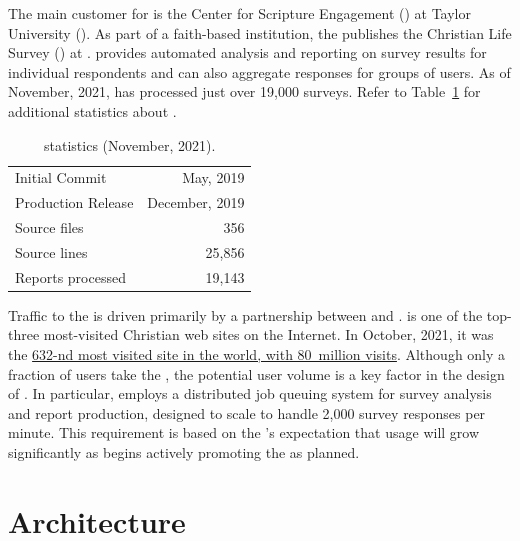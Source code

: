 \documentclass{article}
\begin{document}
The main customer for \caper{}
is the
Center for Scripture Engagement
(\cfse)
at Taylor University (\tu).
As part of a faith-based institution,
the \cfse{} publishes the
Christian Life Survey
(\cls)
at \qual.
\caper{} provides automated analysis and reporting on survey results
for individual respondents and
can also aggregate responses for groups of users.
As of November, 2021,
\caper{} has processed just over 19,000 surveys.
Refer to Table~\ref{tab:caper-stats} for additional statistics about \caper.

\begin{table}
  \centering
  \begin{tabular}{lr}
    \toprule
    Initial Commit     & May, 2019      \\
    Production Release & December, 2019 \\
    \midrule
    Source files       & 356            \\
    Source lines       & 25,856         \\
    \midrule
    Reports processed  & 19,143         \\
    \bottomrule
  \end{tabular}
  \caption{\caper{} statistics (November, 2021).}
  \label{tab:caper-stats}
\end{table}

Traffic to the \cls{} is driven primarily by a partnership between \cfse{} and
\bg.
\bg{} is one of the top-three most-visited Christian web sites on the Internet.
In October, 2021, it was the
\href{https://www.similarweb.com/website/biblegateway.com/}{632-nd most visited site in the world,
  with 80~million visits}.
Although only a fraction of \bg{} users take the \cls,
the potential user volume is a key factor in the design of \caper.
In particular, \caper{} employs a distributed job queuing system
for survey analysis and report production,
designed to scale to handle 2,000 survey responses per minute.
This requirement is based on the \cfse{}'s
expectation that usage will grow significantly as \bg{}
begins actively promoting the \cls{} as planned.

\section{Architecture}
\label{sec:architecture}
\end{document}

